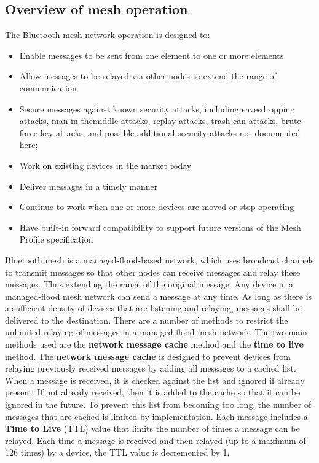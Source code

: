 \documentclass[\main/main.tex]{subfiles}
\begin{document}
\subsection{Overview of mesh operation}
The Bluetooth mesh network operation is designed to:
\begin{itemize}
    \item Enable messages to be sent from one element to one or more elements
    \item Allow messages to be relayed via other nodes to extend the range of communication
    \item Secure messages against known security attacks, including eavesdropping attacks, man-in-themiddle attacks, replay attacks, trash-can attacks, brute-force key attacks, and possible additional security attacks not documented here;
    \item Work on existing devices in the market today
    \item Deliver messages in a timely manner
    \item Continue to work when one or more devices are moved or stop operating
    \item Have built-in forward compatibility to support future versions of the Mesh Profile specification
\end{itemize}

Bluetooth mesh is a managed-flood-based network, which uses  broadcast channels to transmit messages so that other nodes can receive messages and relay these messages. Thus extending the range of the original message. Any device in a managed-flood mesh network can send a message at any time. As long as there is a sufficient density of devices that are listening and relaying, messages shall be delivered to the destination. 
\newline\newline
There are a number of methods to restrict the unlimited relaying of messages in a managed-flood mesh network. The two main methods used are the \textbf{network message cache} method and the \textbf{time to live} method.
\newline\newline
The \textbf{network message cache} is designed to prevent devices from relaying previously received messages by adding all messages to a cached list. When a message is received, it is checked against the list and ignored if already present. If not already received, then it is added to the cache so that it can be ignored in the future. To prevent this list from becoming too long, the number of messages that are cached is limited by implementation.
\newline\newline
Each message includes a \textbf{Time to Live} (TTL) value that limits the number of times a message can be relayed. Each time a message is received and then relayed (up to a maximum of 126 times) by a device, the TTL value is decremented by 1.
\end{document}
